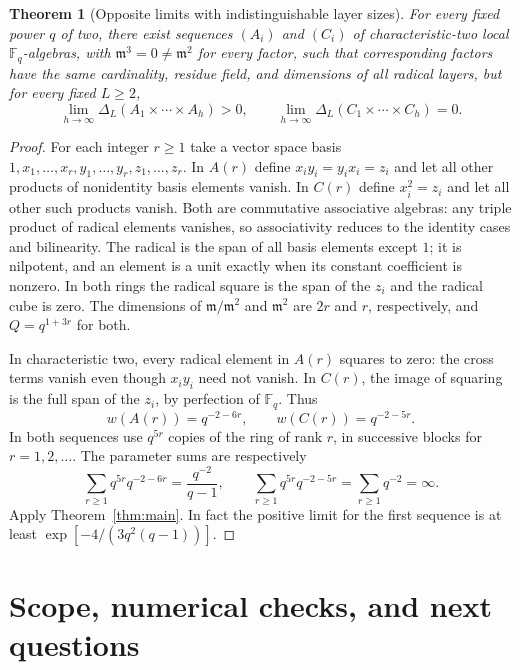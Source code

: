 \documentclass[11pt]{article}
\newtheorem{theorem}{Theorem}[section]
\theoremstyle{remark}\newtheorem{remark}[theorem]{Remark}
\newcommand{\F}{\mathbb F}
\newcommand{\m}{\mathfrak m}
\begin{document}
\begin{theorem}[Opposite limits with indistinguishable layer sizes]\label{thm:opposite}
For every fixed power $q$ of two, there exist sequences $(A_i)$ and $(C_i)$ of characteristic-two local $\F_q$-algebras, with $\m^3=0\ne\m^2$ for every factor, such that corresponding factors have the same cardinality, residue field, and dimensions of all radical layers, but for every fixed $L\ge2$,
\[
 \lim_{h\to\infty}\Delta_L(A_1\times\cdots\times A_h)>0,
 \qquad
 \lim_{h\to\infty}\Delta_L(C_1\times\cdots\times C_h)=0.
\]
\end{theorem}
\begin{proof}
For each integer $r\ge1$ take a vector space basis $1,x_1,\ldots,x_r,y_1,\ldots,y_r,z_1,\ldots,z_r$. In $A(r)$ define $x_i y_i=y_i x_i=z_i$ and let all other products of nonidentity basis elements vanish. In $C(r)$ define $x_i^2=z_i$ and let all other such products vanish. Both are commutative associative algebras: any triple product of radical elements vanishes, so associativity reduces to the identity cases and bilinearity. The radical is the span of all basis elements except $1$; it is nilpotent, and an element is a unit exactly when its constant coefficient is nonzero. In both rings the radical square is the span of the $z_i$ and the radical cube is zero. The dimensions of $\m/\m^2$ and $\m^2$ are $2r$ and $r$, respectively, and $Q=q^{1+3r}$ for both.

In characteristic two, every radical element in $A(r)$ squares to zero: the cross terms vanish even though $x_i y_i$ need not vanish. In $C(r)$, the image of squaring is the full span of the $z_i$, by perfection of $\F_q$. Thus
\[
 w(A(r))=q^{-2-6r},\qquad w(C(r))=q^{-2-5r}.
\]
In both sequences use $q^{5r}$ copies of the ring of rank $r$, in successive blocks for $r=1,2,\ldots$. The parameter sums are respectively
\[
 \sum_{r\ge1}q^{5r}q^{-2-6r}=\frac{q^{-2}}{q-1},
 \qquad
 \sum_{r\ge1}q^{5r}q^{-2-5r}=\sum_{r\ge1}q^{-2}=\infty.
\]
Apply Theorem~\ref{thm:main}. In fact the positive limit for the first sequence is at least $\exp[-4/(3q^2(q-1))]$.
\end{proof}

\section{Scope, numerical checks, and next questions}
\end{document}
